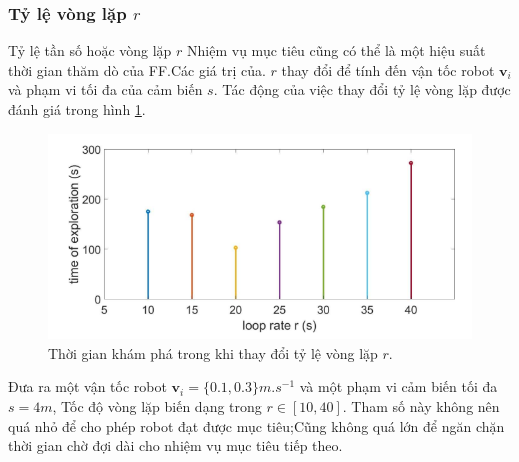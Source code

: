 \documentclass[11pt,openany]{book}
\begin{document}
\begin{algorimth}[H]
\subsubsection{Tỷ lệ vòng lặp $r$}
Tỷ lệ tần số hoặc vòng lặp $r$ Nhiệm vụ mục tiêu cũng có thể là một hiệu suất thời gian thăm dò của FF.Các giá trị của. $r$ thay đổi để tính đến vận tốc robot $\mathbf{v}_i$ và phạm vi tối đa của cảm biến $s$. Tác động của việc thay đổi tỷ lệ vòng lặp được đánh giá trong hình \ref{fig:3.12}.
\begin{figure}[H]
    \centering
    \includegraphics[scale=0.5]{assets/3_12.png}
    \caption{Thời gian khám phá trong khi thay đổi tỷ lệ vòng lặp $r$.}
    \label{fig:3.12}
\end{figure}
Đưa ra một vận tốc robot $\mathbf{v}_i=\{0.1,0.3\}m.s^{-1}$ và một phạm vi cảm biến tối đa $s=4m$, Tốc độ vòng lặp biến dạng trong $r \in [10,40]$. Tham số này không nên quá nhỏ để cho phép robot đạt được mục tiêu;Cũng không quá lớn để ngăn chặn thời gian chờ đợi dài cho nhiệm vụ mục tiêu tiếp theo.

\end{algorimth}
\end{document}
